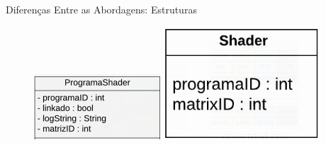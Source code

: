 \documentclass{beamer}
\begin{document}
\begin{frame}{Diferenças Entre as Abordagens: Estruturas}
    \begin{figure}
    \centering
        \begin{minipage}[b]{0.35\textwidth}
            \includegraphics[width=\textwidth]{figuras/shaderood}
        \end{minipage}
        \hspace{1.5cm}
        \begin{minipage}[b]{0.35\textwidth}
            \includegraphics[width=\textwidth]{figuras/shaderdod}
        \end{minipage}
    \end{figure}
\end{frame}
\end{document}
